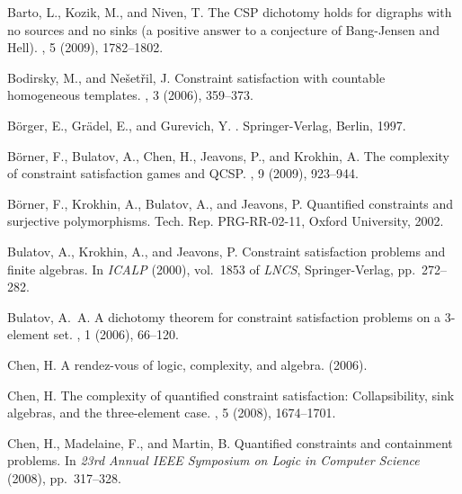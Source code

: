 \documentclass{LMCS}
\begin{document}

\begin{thebibliography}{10}

{\sc Barto, L., Kozik, M., and Niven, T.}
\newblock The {CSP} dichotomy holds for digraphs with no sources and no sinks
  (a positive answer to a conjecture of {Bang-Jensen} and {Hell}).
, 5 (2009), 1782--1802.

{\sc Bodirsky, M., and Ne\v{s}et\v{r}il, J.}
\newblock Constraint satisfaction with countable homogeneous templates.
, 3 (2006), 359--373.

{\sc B{\"o}rger, E., Gr{\"a}del, E., and Gurevich, Y.}
.
\newblock Springer-Verlag, Berlin, 1997.

{\sc B\"{o}rner, F., Bulatov, A., Chen, H., Jeavons, P., and Krokhin, A.}
\newblock The complexity of constraint satisfaction games and {QCSP}.
, 9 (2009), 923--944.

{\sc B\"orner, F., Krokhin, A., Bulatov, A., and Jeavons, P.}
\newblock Quantified constraints and surjective polymorphisms.
\newblock Tech. Rep. PRG-RR-02-11, Oxford University, 2002.

{\sc Bulatov, A., Krokhin, A., and Jeavons, P.}
\newblock Constraint satisfaction problems and finite algebras.
\newblock In {\em ICALP\/} (2000), vol.~1853 of {\em LNCS}, Springer-Verlag,
  pp.~272--282.

{\sc Bulatov, A.~A.}
\newblock A dichotomy theorem for constraint satisfaction problems on a
  3-element set.
, 1 (2006), 66--120.

{\sc Chen, H.}
\newblock A rendez-vous of logic, complexity, and algebra.
 (2006).

{\sc Chen, H.}
\newblock The complexity of quantified constraint satisfaction: Collapsibility,
  sink algebras, and the three-element case.
, 5 (2008), 1674--1701.

{\sc Chen, H., Madelaine, F., and Martin, B.}
\newblock Quantified constraints and containment problems.
\newblock In {\em 23rd Annual IEEE Symposium on Logic in Computer Science\/}
  (2008), pp.~317--328.


\end{thebibliography}
\end{document}
